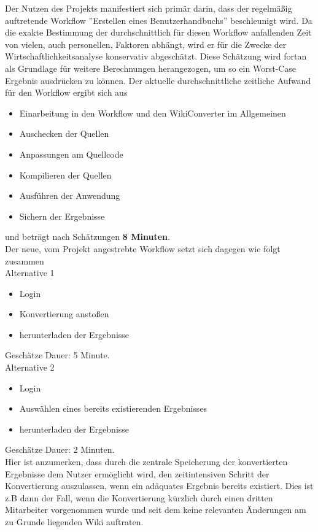 \documentclass[12pt, xcolor=dvipsnames]{scrartcl}
\begin{document}
Der Nutzen des Projekts manifestiert sich primär darin, dass der regelmäßig auftretende Workflow ''Erstellen eines Benutzerhandbuchs'' beschleunigt wird.
Da die exakte Bestimmung der durchschnittlich für diesen Workflow anfallenden Zeit von vielen, auch personellen, Faktoren abhängt, wird er für die Zwecke der Wirtschaftlichkeitsanalyse konservativ abgeschätzt. Diese Schätzung wird fortan als Grundlage für weitere Berechnungen herangezogen, um so ein Worst-Case Ergebnis ausdrücken zu können.
Der aktuelle durchschnittliche zeitliche Aufwand für den Workflow ergibt sich aus
\begin{itemize}
	\item Einarbeitung in den Workflow und den WikiConverter im Allgemeinen
	\item Auschecken der Quellen
	\item Anpassungen am Quellcode
	\item Kompilieren der Quellen
	\item Ausführen der Anwendung
	\item Sichern der Ergebnisse
\end{itemize}
und beträgt nach Schätzungen \textbf{8 Minuten}. \\

Der neue, vom Projekt angestrebte Workflow setzt sich dagegen wie folgt zusammen \\

Alternative 1
\begin{itemize}
	\item Login
	\item Konvertierung anstoßen
	\item herunterladen der Ergebnisse
\end{itemize}
Geschätze Dauer: 5 Minute. \\

Alternative 2
\begin{itemize}
	\item Login
	\item Auswählen eines bereits existierenden Ergebnisses
	\item herunterladen der Ergebnisse
\end{itemize}
Geschätze Dauer: 2 Minuten. \\


Hier ist anzumerken, dass durch die zentrale Speicherung der konvertierten Ergebnisse dem Nutzer ermöglicht wird, den zeitintensiven Schritt der Konvertierung auszulassen, wenn ein adäquates Ergebnis bereits existiert. Dies ist z.B dann der Fall, wenn die Konvertierung kürzlich durch einen dritten Mitarbeiter vorgenommen wurde und seit dem keine relevanten Änderungen am zu Grunde liegenden Wiki auftraten.
\end{document}

